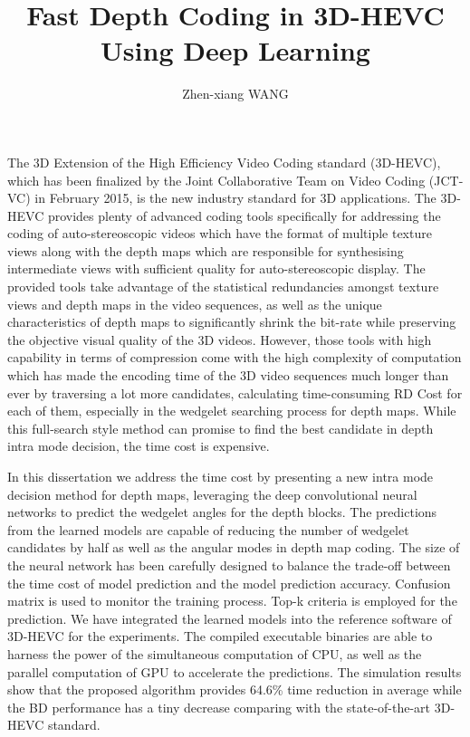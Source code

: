 \documentclass{report}
\begin{document}
    \title{Fast Depth Coding in 3D-HEVC
    Using Deep Learning}
    \author{Zhen-xiang WANG}
    \beforepreface
    The 3D Extension of the High Efficiency Video Coding standard (3D-HEVC),
    which has been finalized by the Joint Collaborative Team on Video Coding
    (JCT-VC) in February 2015, is the new industry standard for 3D applications.
    The 3D-HEVC provides plenty of advanced coding tools specifically
    for addressing the coding of auto-stereoscopic videos which have the format
    of multiple texture views along with the depth maps which are responsible
    for synthesising intermediate views with sufficient quality for
    auto-stereoscopic display.
    The provided tools take advantage of the statistical redundancies amongst
    texture views and depth maps in the video sequences, as well as the unique
    characteristics of depth maps to significantly shrink the bit-rate
    while preserving the objective visual quality of the
    3D videos.
    However, those tools with high capability in terms of compression come
    with the high complexity of computation which has made the encoding time
    of the 3D video sequences much longer than ever by traversing a lot more
    candidates, calculating time-consuming RD Cost for each of them,
    especially in the wedgelet searching process for depth maps.
    While this full-search style method can promise to find the best
    candidate in depth intra mode decision, the time cost is expensive.

    In this dissertation we address the time cost by presenting a new
    intra mode decision method for depth maps, leveraging the deep
    convolutional neural networks to predict the wedgelet angles
    for the depth blocks.
    The predictions from the learned models are capable of
    reducing the number of wedgelet candidates by half as well as the
    angular modes in depth map coding.
    The size of the neural network has been carefully designed to balance
    the trade-off between the time cost of model prediction and the model prediction
    accuracy.
    Confusion matrix is used to monitor the training process.
    Top-k criteria is employed for the prediction.
    We have integrated the learned models into the reference software of
    3D-HEVC for the experiments.
    The compiled executable binaries are able to harness
    the power of the simultaneous computation of CPU, as well as
    the parallel computation of GPU to accelerate the predictions.
    The simulation results show that the proposed algorithm
    provides 64.6\% time reduction in average while the
    BD performance has a tiny decrease comparing with the state-of-the-art 3D-HEVC
    standard.
\end{document}
